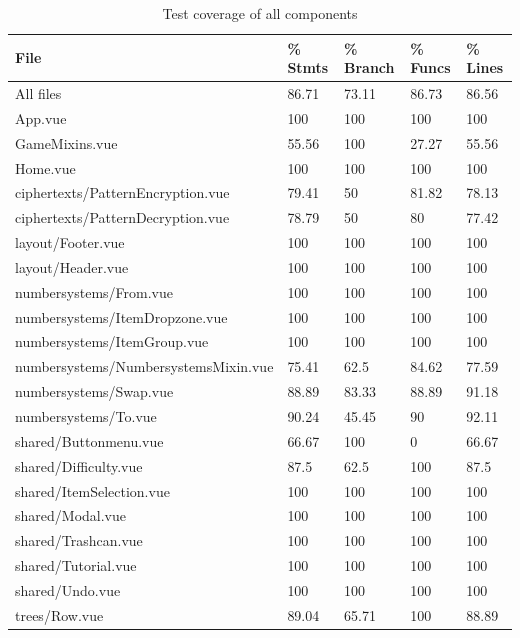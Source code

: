 \begin{table}
    \label{table:testCoverage}
    \caption{Test coverage of all components}
    \centering
    \begin{tabular}{|l|l|l|l|l|}
    \hline
        File & \% Stmts & \% Branch & \% Funcs & \% Lines \\ \hline
        All files & 86.71 & 73.11 & 86.73 & 86.56 \\ \hline
        App.vue & 100 & 100 & 100 & 100 \\ \hline
        GameMixins.vue & 55.56 & 100 & 27.27 & 55.56 \\ \hline
        Home.vue & 100 & 100 & 100 & 100 \\ \hline
        ciphertexts/PatternEncryption.vue & 79.41 & 50 & 81.82 & 78.13 \\ \hline
        ciphertexts/PatternDecryption.vue & 78.79 & 50 & 80 & 77.42 \\ \hline
        layout/Footer.vue & 100 & 100 & 100 & 100 \\ \hline
        layout/Header.vue & 100 & 100 & 100 & 100 \\ \hline
        numbersystems/From.vue & 100 & 100 & 100 & 100 \\ \hline
        numbersystems/ItemDropzone.vue & 100 & 100 & 100 & 100 \\ \hline
        numbersystems/ItemGroup.vue & 100 & 100 & 100 & 100 \\ \hline
        numbersystems/NumbersystemsMixin.vue & 75.41 & 62.5 & 84.62 & 77.59 \\ \hline
        numbersystems/Swap.vue & 88.89 & 83.33 & 88.89 & 91.18 \\ \hline
        numbersystems/To.vue & 90.24 & 45.45 & 90 & 92.11 \\ \hline
        shared/Buttonmenu.vue & 66.67 & 100 & 0 & 66.67 \\ \hline
        shared/Difficulty.vue & 87.5 & 62.5 & 100 & 87.5 \\ \hline
        shared/ItemSelection.vue & 100 & 100 & 100 & 100 \\ \hline
        shared/Modal.vue & 100 & 100 & 100 & 100 \\ \hline
        shared/Trashcan.vue & 100 & 100 & 100 & 100 \\ \hline
        shared/Tutorial.vue & 100 & 100 & 100 & 100 \\ \hline
        shared/Undo.vue & 100 & 100 & 100 & 100 \\ \hline
        trees/Row.vue & 89.04 & 65.71 & 100 & 88.89 \\ \hline

\end{tabular}
\end{table}
